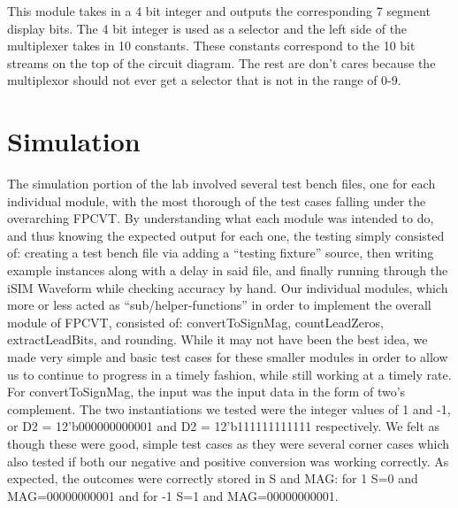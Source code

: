 \documentclass{article}
\begin{document}
This module takes in a 4 bit integer and outputs the corresponding 7 segment display bits. The 4 bit integer is used as a selector and the left side of the multiplexer takes in 10 constants. These constants correspond to the 10 bit streams on the top of the circuit diagram. The rest are don't cares because the multiplexor should not ever get a selector that is not in the range of 0-9.


\section*{Simulation}


The simulation portion of the lab involved several test bench files, one for each individual module, with the most thorough of the test cases falling under the overarching FPCVT.  By understanding what each module was intended to do, and thus knowing the expected output for each one, the testing simply consisted of: creating a test bench file via adding a ``testing fixture'' source, then writing example instances along with a delay in said file, and finally running through the iSIM Waveform while checking accuracy by hand. Our individual modules, which more or less acted as ``sub/helper-functions'' in order to implement the overall module of FPCVT, consisted of: convertToSignMag, countLeadZeros, extractLeadBits, and rounding.  While it may not have been the best idea, we made very simple and basic test cases for these smaller modules in order to allow us to continue to progress in a timely fashion, while still working at a timely rate.  \\ 

For convertToSignMag, the input was the input data in the form of two's complement.  The two instantiations we tested were the integer values of 1 and -1, or D2 = 12'b000000000001 and D2 = 12'b111111111111 respectively.  We felt as though these were good, simple test cases as they were several corner cases which also tested if both our negative and positive conversion was working correctly.  As expected, the outcomes were correctly stored in S and MAG: for 1 S=0 and MAG=00000000001 and for -1 S=1 and MAG=00000000001.     
\end{document}
